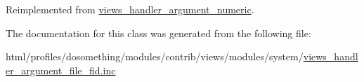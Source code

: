 Reimplemented from \hyperlink{classviews__handler__argument__numeric_a5c6f566b06bad6057e92f15d82311c7b}{views\_\-handler\_\-argument\_\-numeric}.

The documentation for this class was generated from the following file:\begin{DoxyCompactItemize}
\item 
html/profiles/dosomething/modules/contrib/views/modules/system/\hyperlink{views__handler__argument__file__fid_8inc}{views\_\-handler\_\-argument\_\-file\_\-fid.inc}\end{DoxyCompactItemize}
